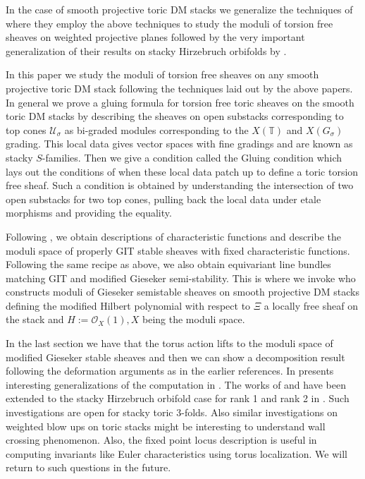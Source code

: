 \documentclass[10pt]{amsart}
\newcommand{\sO}{{\mathcal O}}
\newcommand{\red}{\mathop{\rm red}\nolimits}
\numberwithin{equation}{subsection}
\begin{document}
In the case of smooth projective toric DM stacks we generalize the techniques of \cite{GJK} where they employ the above techniques to study the moduli of torsion free sheaves on weighted projective planes followed by the very important generalization of their results on stacky Hirzebruch orbifolds by \cite{WW}.\par
In this paper we study the moduli of torsion free sheaves on any smooth projective toric DM stack following the techniques laid out by the above papers. In general we prove a gluing formula for torsion free toric sheaves on the smooth toric DM stacks by describing the sheaves on open substacks corresponding to top cones $\mathscr{U_{\sigma}}$ as bi-graded modules corresponding to the $X(\mathbb T)$ and $X(G_{\sigma})$ grading. This local data gives vector spaces with fine gradings and are known as stacky $S$-families. Then we give a condition called the Gluing condition which lays out the conditions of when these local data patch up to define a toric torsion free sheaf. Such a condition is obtained by understanding the intersection of two open substacks for two top cones, pulling back the local data under etale morphisms and providing the equality.\par 
Following \cite{Koo2},\cite{WW} we obtain descriptions of characteristic functions and describe the moduli space of properly GIT stable sheaves with fixed characteristic functions. Following the same recipe as above,\cite{Dol} we also obtain equivariant line bundles matching GIT and modified Gieseker semi-stability. This is where we invoke \cite{Nir} who constructs moduli of Gieseker semistable sheaves on smooth projective DM stacks defining the modified Hilbert polynomial with respect to $\Xi$ a locally free sheaf on the stack and $H:=\sO_{X}(1),X$ being the moduli space.\par
In the last section we have that the torus action lifts to the moduli space of modified Gieseker stable sheaves and then we can show a decomposition result following the deformation arguments as in the earlier references. 
In \cite{GJK} presents interesting generalizations of the computation in \cite{Koo3}. The works of \cite{Got} and \cite{LGot} have been extended to the stacky Hirzebruch orbifold case for rank 1 and rank 2 in \cite{WW}. Such investigations are open for stacky toric 3-folds. Also similar investigations on weighted blow ups on toric stacks might be interesting to understand wall crossing phenomenon. Also, the fixed point locus description is useful in computing invariants like Euler characteristics using torus localization. We will return to such questions in the future.\red\fi
\end{document}
